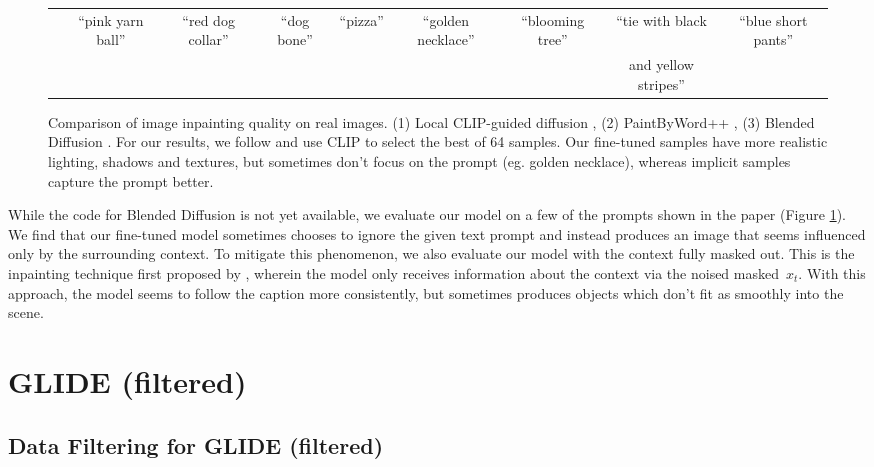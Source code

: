 \documentclass{article}
\newcommand{\modelname}{GLIDE}
\begin{document}
\begin{figure}[t]
\begin{tabular}{ccccccccc}
        &
        \scriptsize{``pink yarn ball''} &
        \scriptsize{``red dog collar''} &
        \scriptsize{``dog bone''} &
        \scriptsize{``pizza''} &
        \scriptsize{``golden necklace''} &
        \scriptsize{``blooming tree''} &
        \scriptsize{``tie with black} &
        \scriptsize{``blue short pants''} \\

        &&&&&&& \scriptsize{and yellow stripes''} & \\
    \end{tabular}
    
    \caption{Comparison of image inpainting quality on real images. (1) Local CLIP-guided diffusion \citep{clipdiff}, (2) PaintByWord++ \citep{paintbyword,blendeddiff}, (3) Blended Diffusion \citep{blendeddiff}. For our results, we follow \citet{blendeddiff} and use CLIP to select the best of 64 samples. Our fine-tuned samples have more realistic lighting, shadows and textures, but sometimes don't focus on the prompt (eg. golden necklace), whereas implicit samples capture the prompt better.}
    \label{fig:blended_inpaint_comp}
    \vskip -0.1in
\end{figure}

While the code for Blended Diffusion \citep{blendeddiff} is not yet available, we evaluate our model on a few of the prompts shown in the paper (Figure \ref{fig:blended_inpaint_comp}). We find that our fine-tuned model sometimes chooses to ignore the given text prompt and instead produces an image that seems influenced only by the surrounding context. To mitigate this phenomenon, we also evaluate our model with the context fully masked out. This is the inpainting technique first proposed by \citet{dickstein}, wherein the model only receives information about the context via the noised masked~$x_t$. With this approach, the model seems to follow the caption more consistently, but sometimes produces objects which don't fit as smoothly into the scene.

\section{\modelname{} (filtered)}
\subsection{Data Filtering for \modelname{} (filtered)}
\label{app:data_filtering}
\end{document}

